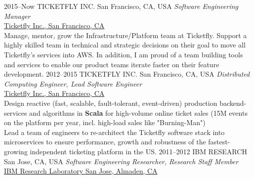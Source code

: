 \documentclass[]{friggeri-cv} %
\begin{document}
\begin{entrylist}
\entry
{2015--Now}
{TICKETFLY INC.}
{San Francisco, CA, USA}
{\emph{Software Engineering Manager} \\
{\href{http://www.ticketfly.com/}{Ticketfly Inc., San Francisco, CA}}{}{} \\
{\color{blue}{\large{$\star$}}} Manage, mentor, grow the Infrastructure/Platform team
at Ticketfly. Support a highly skilled team in technical and strategic decisions on
their goal to move all Ticketfly's services into AWS. In addition, I am proud of a team
building tools and services to enable our product teams iterate faster on their feature development.}
\vspace{0.3em}
\entry
{2012--2015}
{TICKETFLY INC.}
{San Francisco, CA, USA}
{\emph{Distributed Computing Engineer, Lead Software Engineer} \\
{\href{http://www.ticketfly.com/}{Ticketfly Inc., San Francisco, CA}}{}{} \\
{\color{blue}{\large{$\star$}}} Design reactive (fast, scalable, fault-tolerant, event-driven)
production backend-services and algorithms in \textbf{Scala} for high-volume
online ticket sales (15M events on the platform per year, incl. high-load sales like "Burning-Man") 
\\
{\color{blue}{\large{$\star$}}} Lead a team of engineers to re-architect the Ticketfly software stack into
microservices to ensure performance, growth and robustness of the fastest-growing
independent ticketing platform in the US.}
\vspace{0.3em}
\entry
{2011--2012}
{IBM RESEARCH}
{San Jose, CA, USA}
{\emph{Software Engineering Researcher, Research Staff Member} \\
{\href{http://www.almaden.ibm.com/}{IBM Research Laboratory San Jose, Almaden, CA}}{}{} \\
}
\end{entrylist}
\end{document}
